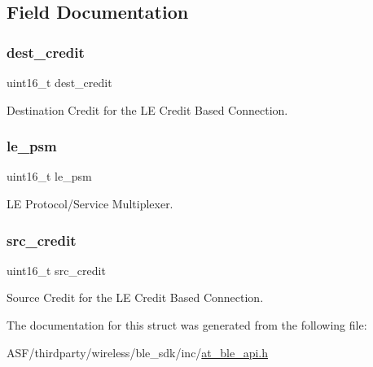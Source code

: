 \subsection{Field Documentation}
\mbox{\label{structat__ble__lecb__add__credit__ind__t_ac885778ddeb570d83c60b0d142d9de73}} 
\subsubsection{\texorpdfstring{dest\_credit}{dest\_credit}}
{\footnotesize\ttfamily uint16\+\_\+t dest\+\_\+credit}



Destination Credit for the LE Credit Based Connection. 

\mbox{\label{structat__ble__lecb__add__credit__ind__t_a2dad6ef37aefd9fc94375d265be0c7c9}} 
\subsubsection{\texorpdfstring{le\_psm}{le\_psm}}
{\footnotesize\ttfamily uint16\+\_\+t le\+\_\+psm}



LE Protocol/\+Service Multiplexer. 

\mbox{\label{structat__ble__lecb__add__credit__ind__t_a5e6b53fc6ab3be34fa0432c99ee05905}} 
\subsubsection{\texorpdfstring{src\_credit}{src\_credit}}
{\footnotesize\ttfamily uint16\+\_\+t src\+\_\+credit}



Source Credit for the LE Credit Based Connection. 



The documentation for this struct was generated from the following file\+:\begin{DoxyCompactItemize}
\item 
A\+S\+F/thirdparty/wireless/ble\+\_\+sdk/inc/\mbox{\hyperlink{at__ble__api_8h}{at\+\_\+ble\+\_\+api.\+h}}\end{DoxyCompactItemize}
